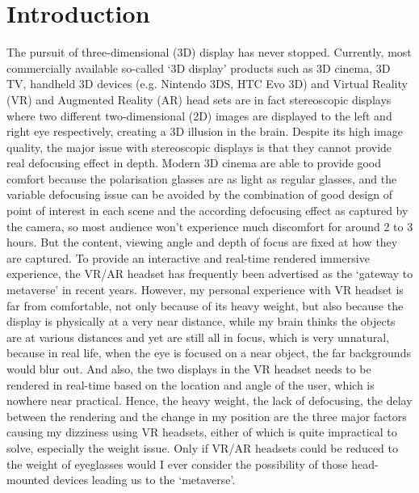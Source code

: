 
\chapter{Introduction}
\graphicspath{{Chapter_Intro/Figs/}}

The pursuit of three-dimensional (3D) display has never stopped. Currently, most commercially available so-called `3D display' products such as 3D cinema, 3D TV, handheld 3D devices (e.g. Nintendo 3DS, HTC Evo 3D) and Virtual Reality (VR) and Augmented Reality (AR) head sets are in fact stereoscopic displays where two different two-dimensional (2D) images are displayed to the left and right eye respectively, creating a 3D illusion in the brain. Despite its high image quality, the major issue with stereoscopic displays is that they cannot provide real defocusing effect in depth. Modern 3D cinema are able to provide good comfort because the polarisation glasses are as light as regular glasses, and the variable defocusing issue can be avoided by the combination of good design of point of interest in each scene and the according defocusing effect as captured by the camera, so most audience won't experience much discomfort for around 2 to 3 hours. But the content, viewing angle and depth of focus are fixed at how they are captured. To provide an interactive and real-time rendered immersive experience, the VR/AR headset has frequently been advertised as the `gateway to metaverse' in recent years. However, my personal experience with VR headset is far from comfortable, not only because of its heavy weight, but also because the display is physically at a very near distance, while my brain thinks the objects are at various distances and yet are still all in focus, which is very unnatural, because in real life, when the eye is focused on a near object, the far backgrounds would blur out. And also, the two displays in the VR headset needs to be rendered in real-time based on the location and angle of the user, which is nowhere near practical. Hence, the heavy weight, the lack of defocusing, the delay between the rendering and the change in my position are the three major factors causing my dizziness using VR headsets, either of which is quite impractical to solve, especially the weight issue. Only if VR/AR headsets could be reduced to the weight of eyeglasses would I ever consider the possibility of those head-mounted devices leading us to the `metaverse'.

